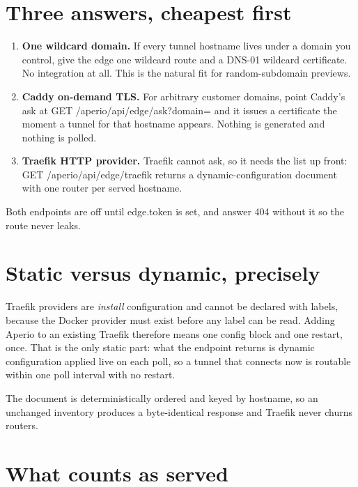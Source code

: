 \documentclass[11pt,a4paper,oneside]{book}
\newcommand{\aperiobreakableunderscore}{\textunderscore\allowbreak}
\newcommand{\aperiocodebreaks}{\XeTeXinterchartokenstate=1 }
\newcommand{\aperiocodebreaks}{}
\DeclareRobustCommand{\code}[1]{{\ttfamily\small\aperiocodebreaks
  \let\_\aperiobreakableunderscore#1}}
\begin{document}
\section{Three answers, cheapest first}

\begin{enumerate}[leftmargin=1.5em]
  \item \textbf{One wildcard domain.} If every tunnel hostname lives under
        a domain you control, give the edge one wildcard route and a
        DNS-01 wildcard certificate. No integration at all. This is the
        natural fit for random-subdomain previews.
  \item \textbf{Caddy on-demand TLS.} For arbitrary customer domains,
        point Caddy's \code{ask} at
        \code{GET /aperio/api/edge/ask?domain=} and it issues a
        certificate the moment a tunnel for that hostname appears.
        Nothing is generated and nothing is polled.
  \item \textbf{Traefik HTTP provider.} Traefik cannot ask, so it needs
        the list up front:
        \code{GET /aperio/api/edge/traefik} returns a dynamic-configuration
        document with one router per served hostname.
\end{enumerate}

Both endpoints are off until \code{edge.token} is set, and answer
\code{404} without it so the route never leaks.

\section{Static versus dynamic, precisely}

Traefik providers are \emph{install} configuration and cannot be declared
with labels, because the Docker provider must exist before any label can
be read. Adding Aperio to an existing Traefik therefore means one config
block and one restart, once. That is the only static part: what the
endpoint returns is dynamic configuration applied live on each poll, so a
tunnel that connects now is routable within one poll interval with no
restart.

The document is deterministically ordered and keyed by hostname, so an
unchanged inventory produces a byte-identical response and Traefik never
churns routers.

\section{What counts as served}
\end{document}
